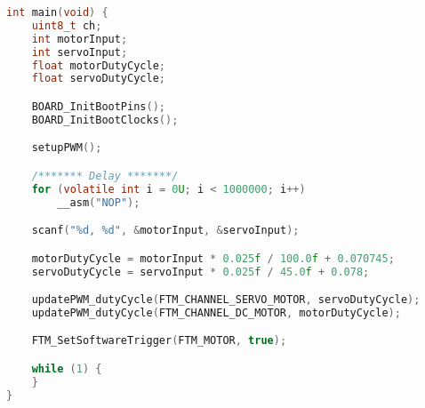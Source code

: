 \begin{lstlisting}[language=c,caption=Problem 1 main, label=list:p1]
int main(void) {
    uint8_t ch;
    int motorInput;
    int servoInput;
    float motorDutyCycle;
    float servoDutyCycle;

    BOARD_InitBootPins();
    BOARD_InitBootClocks();

    setupPWM();

    /******* Delay *******/
    for (volatile int i = 0U; i < 1000000; i++)
        __asm("NOP");

    scanf("%d, %d", &motorInput, &servoInput);

    motorDutyCycle = motorInput * 0.025f / 100.0f + 0.070745;
    servoDutyCycle = servoInput * 0.025f / 45.0f + 0.078;

    updatePWM_dutyCycle(FTM_CHANNEL_SERVO_MOTOR, servoDutyCycle);
    updatePWM_dutyCycle(FTM_CHANNEL_DC_MOTOR, motorDutyCycle);

    FTM_SetSoftwareTrigger(FTM_MOTOR, true);

    while (1) {
    }
}
\end{lstlisting}